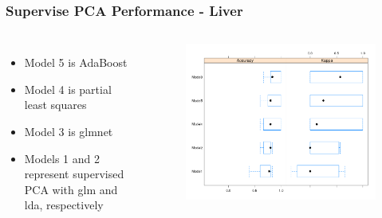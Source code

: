 \documentclass[11pt]{beamer}
\begin{document}
\begin{frame}
\frametitle{Supervise PCA Performance - Liver}
\begin{columns}

{\footnotesize
\begin{itemize}
\item Model 5 is AdaBoost
\item Model 4 is partial least squares
\item Model 3 is glmnet
\item Models 1 and 2 represent supervised PCA with glm and lda, respectively
\end{itemize}
}
%
\begin{figure}
\includegraphics[scale = 0.25]{resampPlotLiver.png} 
\end{figure}
\end{columns}
\end{frame}
\end{document}

